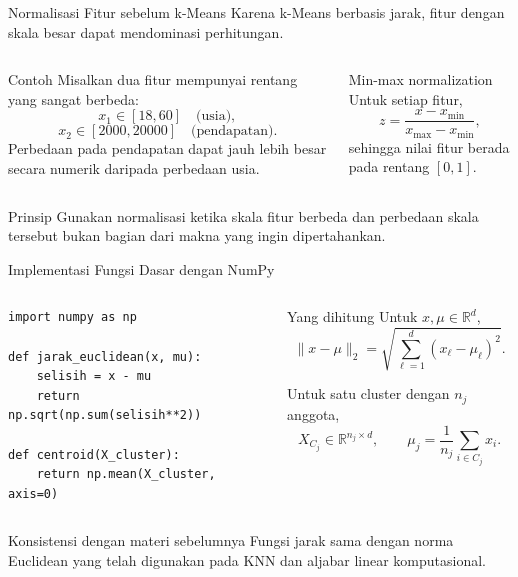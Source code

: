 \documentclass[aspectratio=169,11pt]{beamer}
\begin{document}
\begin{frame}{Normalisasi Fitur sebelum k-Means}
\small
Karena k-Means berbasis jarak, fitur dengan skala besar dapat mendominasi perhitungan.

\begin{columns}[T]
\begin{block}{Contoh}
\footnotesize
Misalkan dua fitur mempunyai rentang yang sangat berbeda:
\[
x_1\in[18,60]\quad\text{(usia)},
\]
\[
x_2\in[2000,20000]\quad\text{(pendapatan)}.
\]
Perbedaan pada pendapatan dapat jauh lebih besar secara numerik daripada perbedaan usia.
\end{block}
\begin{block}{Min-max normalization}
\footnotesize
Untuk setiap fitur,
\[
z
=
\frac{x-x_{\min}}
{x_{\max}-x_{\min}},
\]
sehingga nilai fitur berada pada rentang $[0,1]$.
\end{block}
\end{columns}

\begin{alertblock}{Prinsip}
\footnotesize
Gunakan normalisasi ketika skala fitur berbeda dan perbedaan skala tersebut bukan bagian dari makna yang ingin dipertahankan.
\end{alertblock}
\end{frame}

\begin{frame}[fragile]{Implementasi Fungsi Dasar dengan NumPy}
\begin{columns}[T]
\begin{lstlisting}
import numpy as np

def jarak_euclidean(x, mu):
    selisih = x - mu
    return np.sqrt(np.sum(selisih**2))

def centroid(X_cluster):
    return np.mean(X_cluster, axis=0)
\end{lstlisting}

\small
\begin{block}{Yang dihitung}
\footnotesize
Untuk $x,\mu\in\mathbb{R}^d$,
\[
\|x-\mu\|_2
=
\sqrt{\sum_{\ell=1}^{d}(x_\ell-\mu_\ell)^2}.
\]

Untuk satu cluster dengan $n_j$ anggota,
\[
X_{C_j}\in\mathbb{R}^{n_j\times d},
\qquad
\mu_j
=
\frac1{n_j}\sum_{i\in C_j}x_i.
\]
\end{block}
\end{columns}

\begin{alertblock}{Konsistensi dengan materi sebelumnya}
\footnotesize
Fungsi jarak sama dengan norma Euclidean yang telah digunakan pada KNN dan aljabar linear komputasional.
\end{alertblock}
\end{frame}
\end{document}
